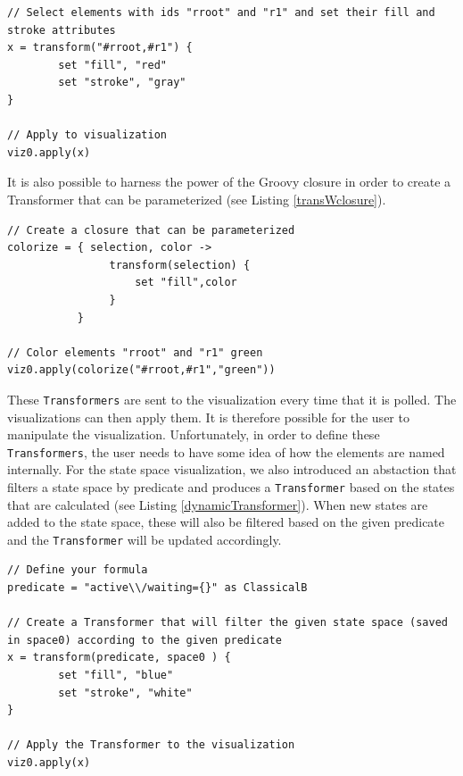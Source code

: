 \lstset{language=java}
\begin{lstlisting}[caption=Define rules for the transformation of visualization elements,label=transformer]
// Select elements with ids "rroot" and "r1" and set their fill and stroke attributes
x = transform("#rroot,#r1") {
        set "fill", "red"
        set "stroke", "gray"
}

// Apply to visualization
viz0.apply(x)
\end{lstlisting}

It is also possible to harness the power of the Groovy closure in order to create a Transformer that can be parameterized (see Listing \ref{transWclosure}).

\begin{lstlisting}[caption=Use Groovy closures to generate Transformers,label=transWclosure]
// Create a closure that can be parameterized
colorize = { selection, color ->
                transform(selection) {
                    set "fill",color
                }    
           }

// Color elements "rroot" and "r1" green
viz0.apply(colorize("#rroot,#r1","green"))
\end{lstlisting}

These \texttt{Transformers} are sent to the visualization every time that it is polled. The visualizations can then apply them. It is therefore possible for the user to manipulate the visualization. Unfortunately, in order to define these \texttt{Transformers}, the user needs to have some idea of how the elements are named internally. For the state space visualization, we also introduced an abstaction that filters a state space by predicate and produces a \texttt{Transformer} based on the states that are calculated (see Listing \ref{dynamicTransformer}). When new states are added to the state space, these will also be filtered based on the given predicate and the \texttt{Transformer} will be updated accordingly. 

\begin{lstlisting}[caption=Create a \texttt{Transformer} based on the states that match a given predicate,label=dynamicTransformer]
// Define your formula
predicate = "active\\/waiting={}" as ClassicalB

// Create a Transformer that will filter the given state space (saved in space0) according to the given predicate
x = transform(predicate, space0 ) {
		set "fill", "blue"
		set "stroke", "white"
}

// Apply the Transformer to the visualization
viz0.apply(x)
\end{lstlisting}


